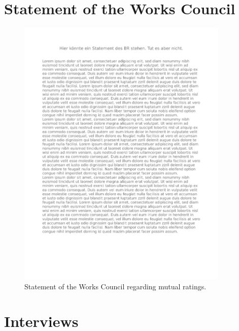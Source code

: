 \cleardoublepage

\appendix
{}

\chapter{Statement of the Works Council}
\label{statement_br}
\begin{figure}[!h]
    \centering
    \includegraphics[width=0.9\textwidth,page=1]{images/statement_br.pdf}
    \caption[Statement of the Works Council]{Statement of the Works Council regarding mutual ratings.}
\end{figure}

\chapter{Interviews}

